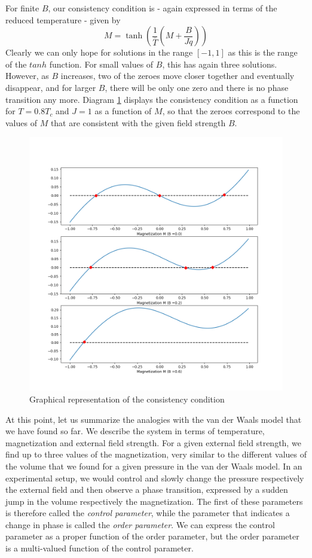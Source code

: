 \documentclass[a4paper, draft]{article}
\theoremstyle{own}
\theoremstyle{remark}
\begin{document}
For finite $B$, our consistency condition is - again expressed in terms of the reduced temperature - given by
$$
M = \tanh(\frac{1}{\bar{T}}(M + \frac{B}{Jq}))
$$
Clearly we can only hope for solutions in the range $[-1, 1]$ as this is the range of the $tanh$ function. For small values of $B$, this has again three solutions. However, as $B$ increases, two of the zeroes move closer together and eventually disappear, and for larger $B$, there will be only one zero and there is no phase transition any more. Diagram \ref{fig:IsingModelMagnetization} displays the consistency condition as a function for $T = 0.8 T_c$ and $J = 1$ as a function of $M$, so that the zeroes correspond to the values of $M$ that are consistent with the given field strength $B$. 

\begin{figure}[ht]
	\centering
	\includegraphics[scale=.5]{IsingModelMagnetization}
	\caption{Graphical representation of the consistency condition}
	\label{fig:IsingModelMagnetization}
\end{figure}

At this point, let us summarize the analogies with the van der Waals model that we have found so far. We describe the system in terms of temperature, magnetization and external field strength. For a given external field strength, we find up to three values of the magnetization, very similar to the different values of the volume that we found for a given pressure in the van der Waals model. In an experimental setup, we would control and slowly change the pressure respectively the external field and then observe a phase transition, expressed by a sudden jump in the volume respectively the magnetization. The first of these parameters is therefore called the {\em control parameter}, while the parameter that indicates a change in phase is called the {\em order parameter}. We can express the control parameter as a proper function of the order parameter, but the order parameter is a multi-valued function of the control parameter. 
\end{document}
